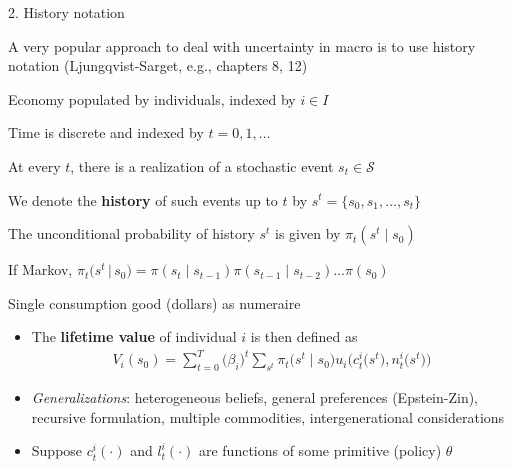 \documentclass[11pt, aspectratio=169]{beamer}
\newenvironment{witemize}{\itemize\addtolength{\itemsep}{10pt}}{\enditemize}
\begin{document}
\begin{frame}{2. History notation}
\begin{witemize}
\item A very popular approach to deal with uncertainty in macro is to use history notation (Ljungqvist-Sarget, e.g., chapters 8, 12)

\item Economy populated by individuals, indexed by $i \in I$

\item Time is discrete and indexed by $t = 0, 1, \ldots$

\item At every $t$, there is a realization of a stochastic event $s_t \in \mathcal S$

\item We denote the \textbf{history} of such events up to $t$ by $s^t = \{s_0, s_1, \ldots, s_t\}$

\item The unconditional probability of history $s^t$ is given by $\pi_t(s^t \mid s_0)$

\item If Markov, $\pi_t \Big( s^t \, | \, s_0 \Big) = \pi(s_t \mid s_{t-1}) \pi(s_{t-1} \mid s_{t-2}) \ldots \pi(s_0)$

\item Single consumption good (dollars) as numeraire
\end{witemize}
\end{frame}



\begin{frame}{}
\begin{itemize}
\item The \textbf{lifetime value} of individual $i$ is then defined as 
\begin{align*}
	V_i(s_0) = \sum_{t=0}^T \Big( \beta_i \Big)^t \sum_{s^t} \pi_t \Big( s^t \mid s_0 \Big) u_i \Big( c_t^i \Big( s^t \Big), n_t^i \Big(s^t \Big) \Big)
\end{align*}

\item \textit{Generalizations}: heterogeneous beliefs, general preferences (Epstein-Zin), recursive formulation, multiple commodities, intergenerational considerations

\item Suppose $c_t^i(\cdot)$ and $l_t^i(\cdot)$ are functions of some primitive (policy) $\theta$

\end{itemize}
\end{frame}
\end{document}
